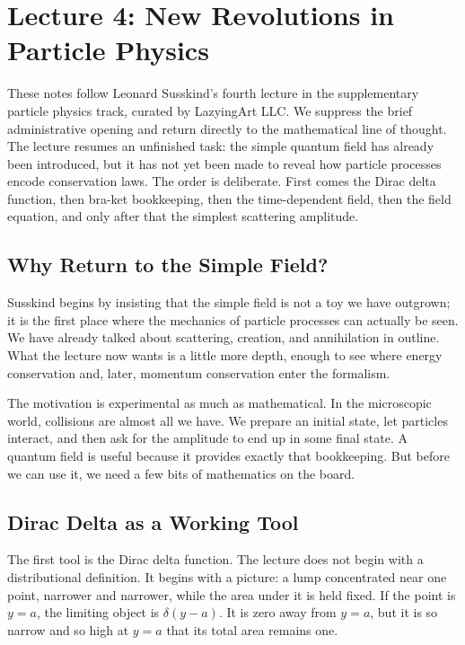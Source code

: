 \chapter{Lecture 4: New Revolutions in Particle Physics}

These notes follow Leonard Susskind's fourth lecture in the supplementary particle physics track, curated by LazyingArt LLC. We suppress the brief administrative opening and return directly to the mathematical line of thought. The lecture resumes an unfinished task: the simple quantum field has already been introduced, but it has not yet been made to reveal how particle processes encode conservation laws. The order is deliberate. First comes the Dirac delta function, then bra-ket bookkeeping, then the time-dependent field, then the field equation, and only after that the simplest scattering amplitude.

\section{Why Return to the Simple Field?}

Susskind begins by insisting that the simple field is not a toy we have outgrown; it is the first place where the mechanics of particle processes can actually be seen. We have already talked about scattering, creation, and annihilation in outline. What the lecture now wants is a little more depth, enough to see where energy conservation and, later, momentum conservation enter the formalism.

The motivation is experimental as much as mathematical. In the microscopic world, collisions are almost all we have. We prepare an initial state, let particles interact, and then ask for the amplitude to end up in some final state. A quantum field is useful because it provides exactly that bookkeeping. But before we can use it, we need a few bits of mathematics on the board.

\section{Dirac Delta as a Working Tool}

The first tool is the Dirac delta function. The lecture does not begin with a distributional definition. It begins with a picture: a lump concentrated near one point, narrower and narrower, while the area under it is held fixed. If the point is \(y=a\), the limiting object is \(\delta(y-a)\). It is zero away from \(y=a\), but it is so narrow and so high at \(y=a\) that its total area remains one.

